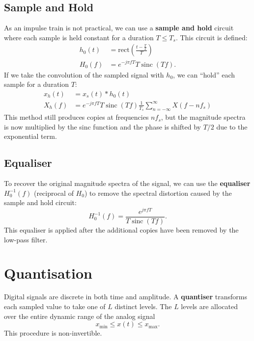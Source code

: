 \documentclass{article}
\DeclareMathOperator{\sinc}{sinc}
\begin{document}
\subsection{Sample and Hold}
As an impulse train is not practical, we can use a \textbf{sample and
hold} circuit where each sample is held constant for a duration \(T
\leq T_s\). This circuit is defined:
\begin{align*}
    h_0\left( t \right) & = \mathrm{rect}\left( \frac{t - \frac{T}{2}}{T} \right) \\
    H_0\left( f \right) & = e^{-j \pi f T} T \sinc{\left( T f \right)}.
\end{align*}
If we take the convolution of the sampled signal with \(h_0\), we can
``hold'' each sample for a duration \(T\):
\begin{align*}
    x_h\left( t \right) & = x_s\left( t \right) * h_0\left( t \right)                                                                   \\
    X_h\left( f \right) & = e^{-j \pi f T} T \sinc{\left( T f \right)} \frac{1}{T_s} \sum_{n = -\infty}^\infty X\left( f - nf_s \right)
\end{align*}
This method still produces copies at frequencies \(n f_s\), but the
magnitude spectra is now multiplied by the sinc function and the phase
is shifted by \(T/2\) due to the exponential term.
\subsection{Equaliser}
To recover the original magnitude spectra of the signal, we can use the
\textbf{equaliser} \(H_0^{-1}\left( f \right)\) (reciprocal of \(H_0\))
to remove the spectral distortion caused by the sample and hold
circuit:
\begin{equation*}
    H_0^{-1}\left( f \right) = \frac{e^{j \pi f T}}{T \sinc{\left( T f \right)}}.
\end{equation*}
This equaliser is applied after the additional copies have been removed by the low-pass filter.
\section{Quantisation}
Digital signals are discrete in both time and amplitude. A
\textbf{quantiser} transforms each sampled value to take one of \(L\)
distinct levels. The \(L\) levels are allocated over the entire dynamic
range of the analog signal
\begin{equation*}
    x_\mathrm{min} \leq x\left( t \right) \leq x_\mathrm{max}.
\end{equation*}
This procedure is non-invertible.
\end{document}
